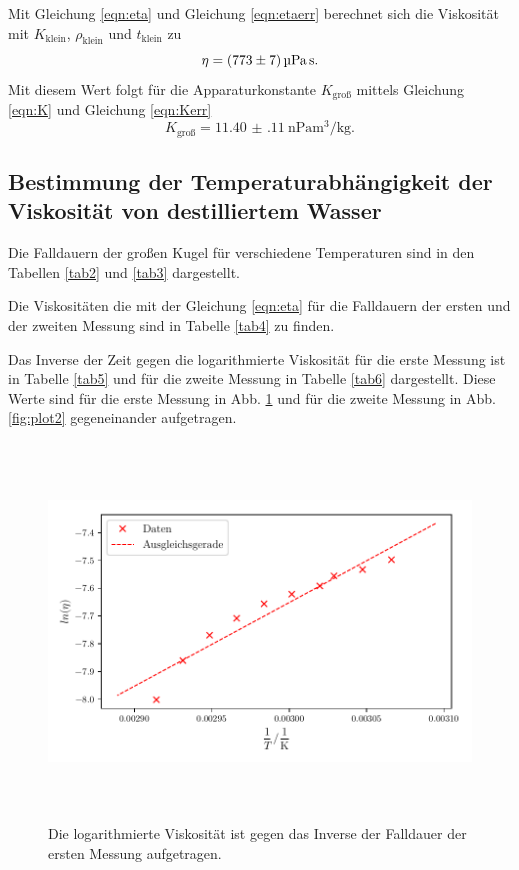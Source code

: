 Mit Gleichung \eqref{eqn:eta} und Gleichung \eqref{eqn:etaerr} berechnet sich die Viskosität mit $K_\text{klein}$,
$\rho_\text{klein}$ und $t_\text{klein}$ zu
\begin{equation*}
    \eta = \SI{773 \pm 7}{\micro\pascal\second}.
\end{equation*}
Mit diesem Wert folgt für die Apparaturkonstante $K_\text{groß}$
mittels Gleichung \eqref{eqn:K} und Gleichung \eqref{eqn:Kerr}
\begin{equation*}
    K_\text{groß} = \SI{11.40(11)}{\nano\pascal\cubic\meter\per\kilo\gram}.
\end{equation*}

\subsection{Bestimmung der Temperaturabhängigkeit der Viskosität von destilliertem Wasser}
Die Falldauern der großen Kugel für verschiedene Temperaturen sind in den Tabellen
\ref{tab2} und \ref{tab3} dargestellt.


\noindent Die Viskositäten die mit der Gleichung \eqref{eqn:eta} für die Falldauern der ersten und der zweiten Messung
sind in Tabelle \ref{tab4} zu finden.

\noindent Das Inverse der Zeit gegen die logarithmierte Viskosität für die erste
Messung ist in Tabelle \ref{tab5} und für die zweite Messung in Tabelle
\ref{tab6} dargestellt.
Diese Werte sind für die erste Messung in Abb. \ref{fig:plot1} und für
die zweite Messung in Abb. \ref{fig:plot2} gegeneinander aufgetragen.


\begin{figure}
    \centering
    \includegraphics[width=14cm, height=10cm]{build/plot1.pdf}
    \caption{Die logarithmierte Viskosität ist gegen das Inverse
    der Falldauer der ersten Messung aufgetragen.}
    \label{fig:plot1}
\end{figure}

